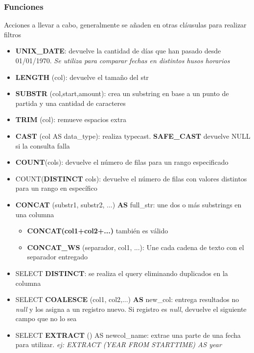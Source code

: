 \subsubsection{Funciones}
Acciones a llevar a cabo, generalmente se añaden en otras cláusulas para realizar filtros
\begin{itemize}
    \item {\textbf{UNIX\_DATE}: devuelve la cantidad de días que han pasado desde 01/01/1970. \textit{Se utiliza para comparar fechas en distintos husos horarios}}
    \item {\textbf{LENGTH} (col): devuelve el tamaño del \gls{str}}
    \item {\textbf{SUBSTR} (col,start,amount): crea un substring en base a un punto de partida y una cantidad de caracteres}
    \item {\textbf{TRIM} (col): remueve espacios extra}
    \item {\textbf{CAST} (col AS data\_type): realiza \gls{typecast}. \textbf{SAFE\_CAST} devuelve NULL si la consulta falla}
    \item {\textbf{COUNT}(cols): devuelve el número de filas para un rango especificado}
    \item {COUNT(\textbf{DISTINCT} cols): devuelve el número de filas con valores distintos para un rango en específico}
    \item {\textbf{CONCAT} (substr1, substr2, ...) \textbf{AS} full\_str: une dos o más substrings en una columna
    \begin{itemize}
        \item {\textbf{CONCAT(col1+col2+...)} también es válido}
        \item {\textbf{CONCAT\_WS} (separador, col1, ...): Une cada cadena de texto con el separador entregado}
    \end{itemize}}
    \item {SELECT \textbf{DISTINCT}: se realiza el query eliminando duplicados en la columna}
    \item {SELECT \textbf{COALESCE} (col1, col2,...) \textbf{AS} new\_col: entrega resultados no \textit{null} y los asigna a un registro nuevo. Si registro es \textit{null}, devuelve el siguiente campo que no lo sea}
    \item {SELECT \textbf{EXTRACT} () AS newcol\_name: extrae una parte de una fecha para utilizar. \textit{ej: EXTRACT (YEAR FROM STARTTIME) AS year} }
\end{itemize}


